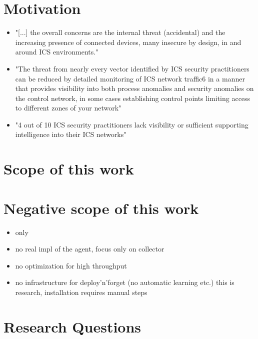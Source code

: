 \section{Motivation}
\begin{itemize}
	\item "[...] the overall concerns are the internal threat (accidental) and the increasing presence of connected devices, many insecure by design, in and around ICS environments." \parencite[p.~9]{Gregory-Brown2017}
	\item "The threat from nearly every vector identified by ICS security practitioners can be reduced by detailed monitoring of ICS network traffic6 in a manner that provides visibility into both process anomalies and security anomalies on the control network, in some cases establishing control points limiting access to different zones of your network" \parencite[p.~10]{Gregory-Brown2017}
	\item "4 out of 10 ICS security practitioners lack visibility or sufficient supporting intelligence into their ICS networks" \parencite[p.~13]{Gregory-Brown2017}
\end{itemize}

\section{Scope of this work}

\section{Negative scope of this work}
\begin{itemize}
	\item only \knx
	\item no real impl of the agent, focus only on collector
	\item no optimization for high throughput
	\item no infrastructure for deploy'n'forget (no automatic learning etc.)
		\subitem this is research, installation requires manual steps
\end{itemize}

\section{Research Questions}

